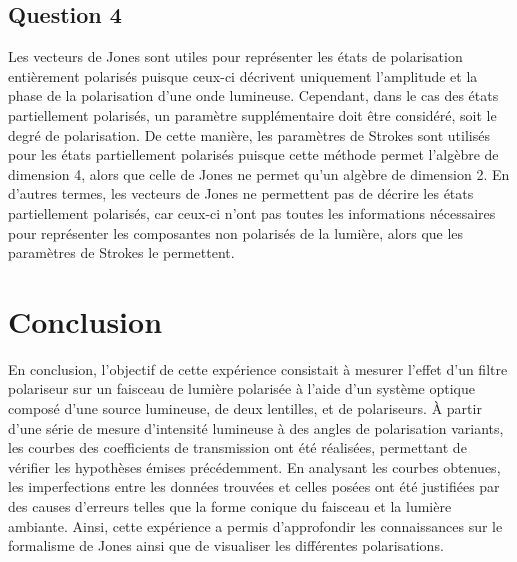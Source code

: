\documentclass[11pt,letterpaper]{article}
\begin{document}
\subsection{Question 4}
Les vecteurs de Jones sont utiles pour représenter les états de polarisation entièrement polarisés puisque ceux-ci décrivent uniquement l'amplitude et la phase de la polarisation d'une onde lumineuse. Cependant, dans le cas des états partiellement polarisés, un paramètre supplémentaire doit être considéré, soit le degré de polarisation. De cette manière, les paramètres de Strokes sont utilisés pour les états partiellement polarisés puisque cette méthode permet l'algèbre de dimension 4, alors que celle de Jones ne permet qu'un algèbre de dimension 2. En d'autres termes, les vecteurs de Jones ne permettent pas de décrire les états partiellement polarisés, car ceux-ci n'ont pas toutes les informations nécessaires pour représenter les composantes non polarisés de la lumière, alors que les paramètres de Strokes le permettent.

\section{Conclusion}
En conclusion, l'objectif de cette expérience consistait à mesurer l'effet d'un filtre polariseur sur un faisceau de lumière polarisée à l'aide d'un système optique composé d'une source lumineuse, de deux lentilles, et de polariseurs. À partir d'une série de mesure d'intensité lumineuse à des angles de polarisation variants, les courbes des coefficients de transmission ont été réalisées, permettant de vérifier les hypothèses émises précédemment. En analysant les courbes obtenues, les imperfections entre les données trouvées et celles posées ont été justifiées par des causes d'erreurs telles que la forme conique du faisceau et la lumière ambiante. Ainsi, cette expérience a permis d'approfondir les connaissances sur le formalisme de Jones ainsi que de visualiser les différentes polarisations.


\clearpage



\end{document}
